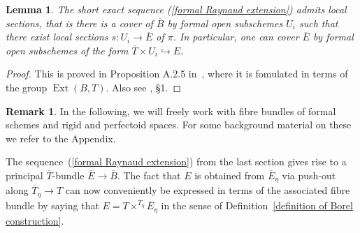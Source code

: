 \documentclass[10pt,oneside]{amsart}
\newtheorem{lemma}[theorem]{Lemma}
\theoremstyle{definition}
\newtheorem{remark}[theorem]{Remark}
\begin{document}
	\begin{lemma}\label{formal Raynaud sequence is locally split}
		The short exact sequence (\ref{formal Raynaud extension}) admits local sections, that is there is a cover of $\overline{B}$ by formal open subschemes $U_i$ such that there exist local sections $s:U_i\rightarrow \overline{E}$ of $\pi$. In particular, one can cover $\overline{E}$ by formal open subschemes of the form $\overline{T}\times U_i\hookrightarrow E$.
	\end{lemma}
	\begin{proof}
		This is proved in Proposition A.2.5 in~\cite{Lut}, where it is fomulated in terms of the group $\operatorname{Ext}(B,T)$. Also see \cite{BL}, \S 1.
	\end{proof}
	
	\begin{remark}
	In the following, we will freely work with fibre bundles of formal schemes and rigid and perfectoid spaces. For some background material on these we refer to the Appendix.
	\end{remark}
	
	The sequence~(\ref{formal Raynaud extension}) from the last section gives rise to a principal $\overline{T}$-bundle
	$\overline{E}\rightarrow \overline{B}$. The fact that $E$ is obtained from $\overline{E}_\eta$ via push-out along $\overline{T}_\eta\rightarrow T$ can now conveniently be expressed in terms of the associated fibre bundle by saying that $E = T\times^{\overline{T}_\eta}\overline{E}_\eta$ in the sense of Definition~\ref{definition of Borel construction}.
\end{document}
